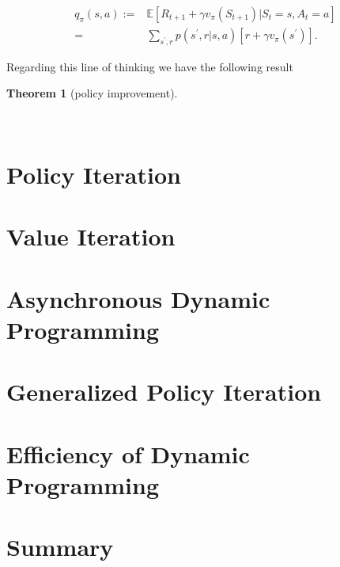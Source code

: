 \documentclass[
  letterpaper,
]{krantz}
\theoremstyle{plain}
\newtheorem{theorem}{Theorem}[chapter]
\theoremstyle{definition}
\theoremstyle{definition}
\theoremstyle{remark}
\begin{document}
\[
\begin{aligned}
    q_{\pi}(s, a) 
        :=& 
            \mathbb{E} 
                \left[
                    R_{t+1} + \gamma v_{\pi}(S_{t+1})
                    | S_t=s ,A_t=a
                \right]
        \\
        =&
            \sum_{s^{\prime},r}
                p(s^{\prime}, r | s,a)
                \left[
                    r + \gamma v_{\pi}(s^{\prime})
                \right].
    \end{aligned}
\]

Regarding this line of thinking we have the following result

\begin{theorem}[policy
improvement]\protect\hypertarget{thm-policy-improvement}{}\label{thm-policy-improvement}

~

\end{theorem}

\section{Policy Iteration}\label{policy-iteration}

\section{Value Iteration}\label{value-iteration-1}

\section{Asynchronous Dynamic
Programming}\label{asynchronous-dynamic-programming}

\section{Generalized Policy
Iteration}\label{generalized-policy-iteration}

\section{Efficiency of Dynamic
Programming}\label{efficiency-of-dynamic-programming}

\section{Summary}\label{summary-3}
\end{document}
